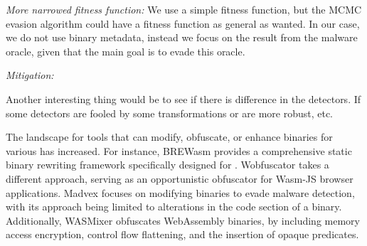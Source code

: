 \emph{More narrowed fitness function:} We use a simple fitness function, but the MCMC evasion algorithm could have a fitness function as general as wanted.
In our case, we do not use binary metadata, instead we focus on the result from the malware oracle, given that the main goal is to evade this oracle.

\emph{Mitigation: } 


Another interesting thing would be to see if there is difference in the detectors. If some detectors are fooled by some transformations or are more robust, etc.


 The landscape for tools that can modify, obfuscate, or enhance \Wasm binaries for various has increased. 
For instance, BREWasm\cite{BREWasm} provides a comprehensive static binary rewriting framework specifically designed for \Wasm. 
Wobfuscator\cite{wobfuscator} takes a different approach, serving as an opportunistic obfuscator for Wasm-JS browser applications. 
Madvex\cite{madvex} focuses on modifying \Wasm binaries to evade malware detection, with its approach being limited to alterations in the code section of a \Wasm binary. 
Additionally, WASMixer\cite{wasmixer} obfuscates WebAssembly binaries, by including memory access encryption, control flow flattening, and the insertion of opaque predicates.


